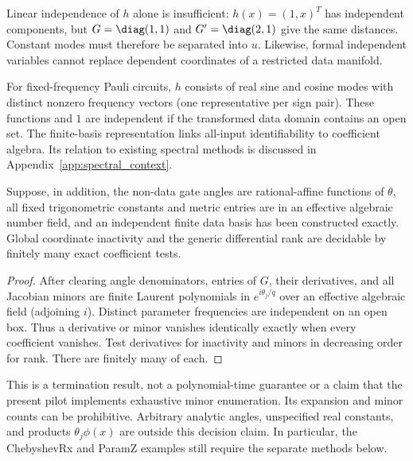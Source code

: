 Linear independence of $h$ alone is insufficient: $h(x)=(1,x)^T$
has independent components, but $G=\diag(1,1)$ and $G'=\diag(2,1)$
give the same distances. Constant modes must therefore be separated
into $u$. Likewise, formal independent variables cannot replace
dependent coordinates of a restricted data manifold.

For fixed-frequency Pauli circuits, $h$ consists of real sine and
cosine modes with distinct nonzero frequency vectors (one representative
per sign pair). These functions and $1$ are independent if the
transformed data domain contains an open set. The finite-basis representation links all-input identifiability to
coefficient algebra. Its relation to existing spectral methods is
discussed in Appendix~\ref{app:spectral_context}.



\begin{corollary}
\label{cor:gramdecision}
Suppose, in addition, the non-data gate angles are rational-affine
functions of $\theta$, all fixed trigonometric constants and metric
entries are in an effective algebraic number field, and an independent
finite data basis has been constructed exactly. Global coordinate
inactivity and the generic differential rank are decidable by finitely
many exact coefficient tests.
\end{corollary}
\begin{proof}
After clearing angle denominators, entries of $G$, their derivatives,
and all Jacobian minors are finite Laurent polynomials in
$e^{i\theta_j/q}$ over an effective algebraic field (adjoining $i$).
Distinct parameter frequencies are independent on an open box.
Thus a derivative or minor vanishes identically exactly when every
coefficient vanishes. Test derivatives for inactivity and minors in
decreasing order for rank. There are finitely many of each.
\end{proof}
This is a termination result, not a polynomial-time guarantee or a
claim that the present pilot implements exhaustive minor enumeration.
Its expansion and minor counts can be prohibitive. Arbitrary analytic
angles, unspecified real constants, and products $\theta_j\phi(x)$
are outside this decision claim. In particular, the ChebyshevRx and
ParamZ examples still require the separate methods below.

